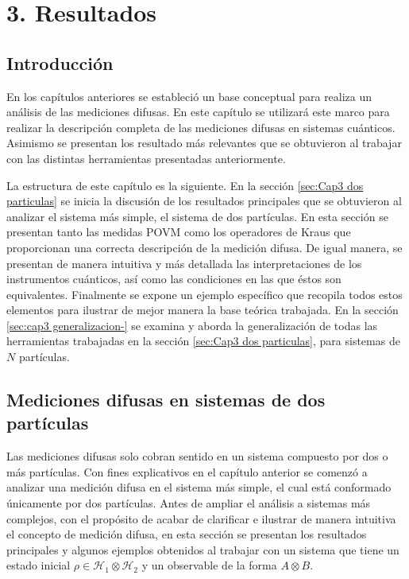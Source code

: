 \chapter[RESULTADOS]{3. Resultados}\label{cap3:resultados}
\section{Introducción} %

    

En los capítulos anteriores se estableció un base conceptual para realiza un
análisis de las mediciones difusas. En este capítulo se utilizará este marco
para realizar la descripción completa de las mediciones difusas en sistemas
cuánticos. Asimismo se presentan los resultado más relevantes que se obtuvieron
al trabajar con las distintas herramientas presentadas anteriormente. 

La estructura de este capítulo es la siguiente. En la sección {\ref{sec:Cap3
dos particulas}} se inicia la discusión de los resultados principales que se
obtuvieron al analizar el sistema más simple, el sistema de dos partículas. En
esta sección se presentan tanto las medidas POVM como los operadores de Kraus
que proporcionan una correcta descripción de la medición difusa. De igual
manera,  se presentan de manera intuitiva y más detallada las interpretaciones
de los instrumentos cuánticos, así como las condiciones en las que éstos son
equivalentes. Finalmente se expone un ejemplo específico que recopila todos
estos elementos para ilustrar de mejor manera la base teórica trabajada. En la
sección {\ref{sec:cap3 generalizacion-}} se examina y aborda la generalización
de todas las herramientas trabajadas en la sección {\ref{sec:Cap3 dos
particulas}}, para sistemas de $N$ partículas.

\section{Mediciones difusas en sistemas de dos partículas}\label{sec:Cap3 dos particulas} %
Las mediciones difusas solo cobran sentido en un sistema compuesto por dos o
más partículas. Con fines explicativos en el capítulo anterior se comenzó a
analizar una medición difusa en el sistema más simple, el cual está conformado
únicamente por dos partículas. Antes de ampliar el análisis a sistemas más
complejos, con el propósito de acabar de clarificar e ilustrar de manera
intuitiva el concepto de medición difusa, en esta sección se presentan los
resultados principales y algunos ejemplos obtenidos al trabajar con un sistema
que tiene un estado inicial $\rho \in \mathcal{H}_1\otimes \mathcal{H}_2$ y un
observable de la forma $A\otimes B$.\par




